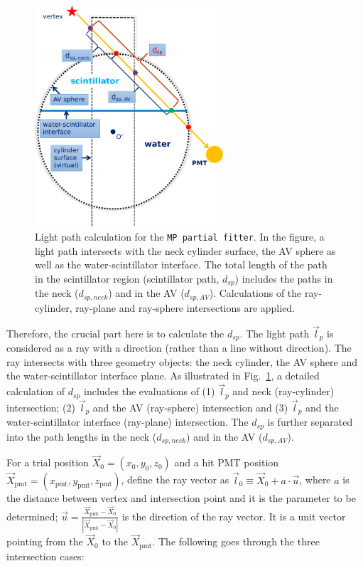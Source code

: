 \begin{figure}[!htb]
	\centering
	\includegraphics[width=7cm]{scintpath.png}
	\caption[Light path calculation for the \texttt{MP partial fitter}.]{Light path calculation for the \texttt{MP partial fitter}. In the figure, a light path intersects with the neck cylinder surface, the AV sphere as well as the water-scintillator interface. The total length of the path in the scintillator region (scintillator path, $d_{sp}$) includes the paths in the neck ($d_{sp,neck}$) and in the AV ($d_{sp,AV}$). Calculations of the ray-cylinder, ray-plane and ray-sphere intersections are applied.}
	\label{fig:scintpath}
\end{figure}

Therefore, the crucial part here is to calculate the $d_{sp}$. The light path $\vec{l}_p$ is considered as a ray with a direction (rather than a line without direction). The ray intersects with three geometry objects: the neck cylinder, the AV sphere and the water-scintillator interface plane. As illustrated in Fig.~\ref{fig:scintpath}, a detailed calculation of $d_{sp}$ includes the evaluations of (1) $\vec{l}_p$ and neck (ray-cylinder) intersection; (2) $\vec{l}_p$ and the AV (ray-sphere) intersection and (3) $\vec{l}_p$ and the water-scintillator interface (ray-plane) intersection. The $d_{sp}$ is further separated into the path lengths in the neck ($d_{sp,neck}$) and in the AV ($d_{sp,AV}$). 

For a trial position $\vec{X}_0=(x_0,y_0,z_0)$ and a hit PMT position $\vec{X}_{\mathrm{pmt}}=(x_\mathrm{pmt},y_\mathrm{pmt},z_\mathrm{pmt})$, define the ray vector as $\vec{l}_0\equiv\vec{X}_0+a\cdot \vec{u}$, where $a$ is the distance between vertex and intersection point and it is the parameter to be determined; $\vec u=\frac{\vec{X}_{\mathrm{pmt}}-\vec{X}_0}{|\vec{X}_{\mathrm{pmt}}-\vec{X}_0|}$ is the direction of the ray vector. It is a unit vector pointing from the $\vec{X}_0$ to the $\vec{X}_{\mathrm{pmt}}$. The following goes through the three intersection cases:

